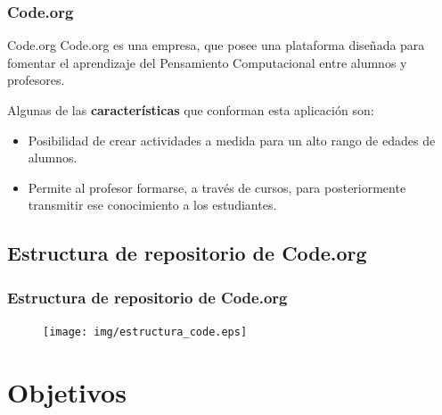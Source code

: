 \documentclass{beamer}
\begin{document}
\begin{frame}

\frametitle{Code.org}

\begin{block}{Code.org}
    Code.org es una empresa, que posee una plataforma diseñada para fomentar el aprendizaje del Pensamiento Computacional entre alumnos y profesores.
\end{block}

Algunas de las \textbf{características} que conforman esta aplicación son:
\begin{itemize}
    \item Posibilidad de crear actividades a medida para un alto rango de edades de alumnos.
    \item Permite al profesor formarse, a través de cursos, para posteriormente transmitir ese conocimiento a los estudiantes.
\end{itemize}

\end{frame}

\subsection{Estructura de repositorio de Code.org}

\begin{frame}

\frametitle{Estructura de repositorio de Code.org}

\begin{figure}
    \texttt{[image: img/estructura\_code.eps]}
\end{figure}

\end{frame}

\section{Objetivos}
\end{document}
